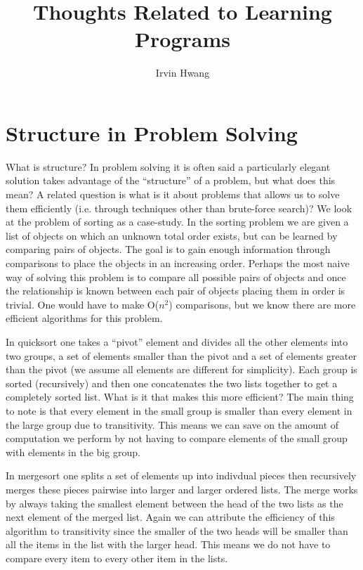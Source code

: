 \documentclass[a4paper,12pt]{article}
\begin{document}
\title{Thoughts Related to Learning Programs}
\author{Irvin Hwang}
\maketitle

\section{Structure in Problem Solving}
What is structure?  In problem solving it is often said a particularly elegant solution takes advantage of the ``structure'' of a problem, but what does this mean?  A related question is what is it about problems that allows us to solve them efficiently (i.e. through techniques other than brute-force search)?  We look at the problem of sorting as a case-study.  In the sorting problem we are given a list of objects on which an unknown total order exists, but can be learned by comparing pairs of objects.  The goal is to gain enough information through comparisons to place the objects in an increasing order.  Perhaps the most naive way of solving this problem is to compare all possible pairs of objects and once the relationship is known between each pair of objects placing them in order is trivial.  One would have to make O($n^2$) comparisons, but we know there are more efficient algorithms for this problem.  

In quicksort one takes a ``pivot'' element and divides all the other elements into two groups, a set of elements smaller than the pivot and a set of elements greater than the pivot (we assume all elements are different for simplicity).  Each group is sorted (recursively) and then one concatenates the two lists together to get a completely sorted list.  What is it that makes this more efficient?  The main thing to note is that every element in the small group is smaller than every element in the large group due to transitivity.  This means we can save on the amount of computation we perform by not having to compare elements of the small group with elements in the big group.

In mergesort one splits a set of elements up into indivdual pieces then recursively merges these pieces pairwise into larger and larger ordered lists.   The merge works by always taking the smallest element between the head of the two lists as the next element of the merged list.  Again we can attribute the efficiency of this algorithm to transitivity since the smaller of the two heads will be smaller than all the items in the list with the larger head.  This means we do not have to compare every item to every other item in the lists.
\end{document}
